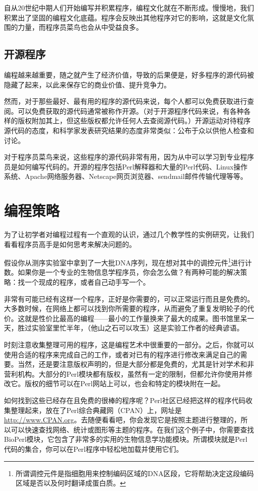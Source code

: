 自从20世纪中期人们开始编写并积累程序，编程文化就在不断形成。慢慢地，我们积累出了坚固的编程文化底蕴。程序会反映出其他程序对它的影响，这就是文化氛围的力量，而程序员菜鸟也会从中受益良多。

\subsection{开源程序}
编程越来越重要，随之就产生了经济价值，导致的后果便是，好多程序的源代码被隐藏了起来，以此来保存它的商业价值、提升竞争力。

然而，对于那些最好、最有用的程序的源代码来说，每个人都可以免费获取进行查阅。可以免费获取的源代码通常被称作开源。（对于开源程序代码来说，有各种各样的版权附加其上，但这些版权都允许任何人去查阅源代码。）开源运动对待程序源代码的态度，和科学家发表研究结果的态度非常类似：公布于众以供他人检查和讨论。

对于程序员菜鸟来说，这些程序的源代码非常有用，因为从中可以学习到专业程序员是如何编写代码的。开源的程序包括Perl解释器和大量的Perl代码、Linux操作系统、Apache网络服务器、Netscape网页浏览器、sendmail邮件传输代理等等。

\section{编程策略}
为了让初学者对编程过程有一个直观的认识，通过几个教学性的实例研究，让我们看看程序员高手是如何思考来解决问题的。

假设你从测序实验室中拿到了一大批DNA序列，现在想对其中的调控元件\footnote{所谓调控元件是指细胞用来控制编码区域的DNA区段，它将帮助决定这段编码区域是否以及何时翻译成蛋白质。}进行计数。如果你是一个专业的生物信息学程序员，你会怎么做？有两种可能的解决策略：找一个现成的程序，或者自己动手写一个。

非常有可能已经有这样一个程序，正好是你需要的，可以正常运行而且是免费的。大多数时候，在网络上都可以找到你所需要的程序，从而避免了重复发明轮子的代价。这就是性价比最高的编程——最小的工作量换来了最大的成果。图书馆里呆一天，胜过实验室里忙半年，（他山之石可以攻玉）这是实验工作者的经典谚语。

时刻注意收集整理可用的程序，这是编程艺术中很重要的一部分。之后，你就可以使用合适的程序来完成自己的工作，或者对已有的程序进行修改来满足自己的需要。当然，还是要注意版权声明的，但是大部分都是免费的，尤其是针对学术和非营利机构。大部分的Perl模块都有版权，虽然有一定的限制，但都允许你使用并修改它。版权的细节可以在Perl网站上可以，也会和特定的模块附在一起。

如何找到这些已经存在且免费的很棒的程序呢？Perl社区已经把这样的程序代码收集整理起来，放在了Perl综合典藏网（CPAN）上，网址是 \href{http://www.CPAN.org}{http://www.CPAN.org}。去随便看看吧，你会发现它是按照主题进行整理的，所以可以快速查找网络、统计或图形等主题的程序。在我们这个例子中，你需要查找BioPerl模块，它包含了非常多的实用的生物信息学功能模块。所谓模块就是Perl代码的集合，你可以在Perl程序中轻松地加载并使用它们。

